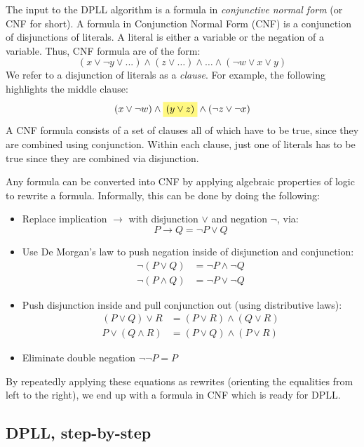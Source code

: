 \documentclass{article}
\theoremstyle{definition}
\newcommand{\highlight}[1]{%
  \colorbox{yellow!50}{$\displaystyle#1$}}
\begin{document}
The input to the DPLL algorithm is a formula in \emph{conjunctive
  normal form} (or CNF for short).  A formula in Conjunction Normal
Form (CNF) is a conjunction of disjunctions of literals. A literal is
either a variable or the negation of a variable. Thus, CNF formula are
of the form:
%
\begin{equation*}
  (\textit{x} \vee \neg \textit{y} \vee ...) \wedge
  (\textit{z} \vee \ldots) \wedge \ldots \wedge
  (\neg \textit{w} \vee \textit{x} \vee \textit{y})
\end{equation*}
%
We refer to a disjunction of literals as a \emph{clause}.
For example, the following highlights the middle clause:
%
\begin{equation}
(x \vee \neg w) \wedge \highlight{(y \vee z)} \wedge (\neg z \vee \neg x)
\end{equation}
%
A CNF formula consists of a set of clauses all of which have to be
true, since they are combined using conjunction. Within each clause,
just one of literals has to be true since they are combined via
disjunction.

Any formula can be converted into CNF by applying algebraic properties
of logic to rewrite a formula. Informally, this can be done by
doing the following:
%
\begin{itemize}[leftmargin=1em]
\item Replace implication $\rightarrow$ with disjunction $\vee$
and negation $\neg$, via: $$P \rightarrow Q = \neg P \vee Q$$
\item Use De Morgan's law to push negation inside of
disjunction and conjunction:
\begin{align*}
\neg (P \vee Q) & = \neg P \wedge \neg Q \\
\neg (P \wedge Q) & = \neg P \vee \neg Q
\end{align*}
\item Push disjunction inside and pull conjunction out (using
  distributive laws):
%
\begin{align*}
(P \vee Q) \vee R & = (P \vee R) \wedge (Q \vee R) \\
P \vee (Q \wedge R) & = (P \vee Q) \wedge (P \vee R)
\end{align*}
\item Eliminate double negation $\neg\neg P = P$
%
\end{itemize}
%
By repeatedly applying these equations as rewrites (orienting the
equalities from left to the right), we end up with a formula
in CNF which is ready for DPLL.

\subsection{DPLL, step-by-step}
\end{document}
